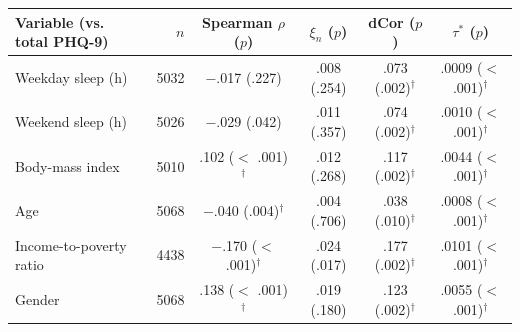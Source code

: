 \begin{tabular}{lrcccc}
\toprule
Variable (vs. total PHQ-9) & $n$ & Spearman $\rho$ ($p$) & $\xi_n$ ($p$) & dCor ($p$) & $\tau^*$ ($p$) \\
\midrule
Weekday sleep (h) & 5032 & $-$.017 (.227) & .008 (.254) & .073 (.002)$^{\dagger}$ & .0009 ($<$ .001)$^{\dagger}$ \\
Weekend sleep (h) & 5026 & $-$.029 (.042) & .011 (.357) & .074 (.002)$^{\dagger}$ & .0010 ($<$ .001)$^{\dagger}$ \\
Body-mass index & 5010 & .102 ($<$ .001)$^{\dagger}$ & .012 (.268) & .117 (.002)$^{\dagger}$ & .0044 ($<$ .001)$^{\dagger}$ \\
Age & 5068 & $-$.040 (.004)$^{\dagger}$ & .004 (.706) & .038 (.010)$^{\dagger}$ & .0008 ($<$ .001)$^{\dagger}$ \\
Income-to-poverty ratio & 4438 & $-$.170 ($<$ .001)$^{\dagger}$ & .024 (.017) & .177 (.002)$^{\dagger}$ & .0101 ($<$ .001)$^{\dagger}$ \\
Gender & 5068 & .138 ($<$ .001)$^{\dagger}$ & .019 (.180) & .123 (.002)$^{\dagger}$ & .0055 ($<$ .001)$^{\dagger}$ \\
\bottomrule
\end{tabular}
